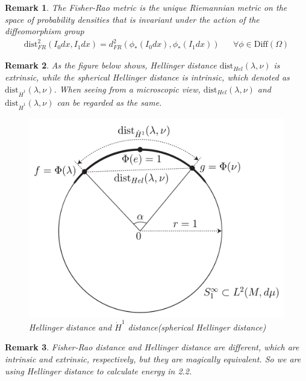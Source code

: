 \documentclass{article}
\theoremstyle{definition}
\theoremstyle{plain}
\newtheorem{remark}{Remark}
\begin{document}
\begin{remark}
The Fisher-Rao metric is the unique Riemannian metric on the space of probability densities that is invariant under the action of the diffeomorphism group
\begin{align*}
    \mathrm{dist}^2_{FR}(I_0dx,I_1dx)=d^2_{FR}(\phi_*(I_0dx),\phi_*(I_1dx)) &&\forall \phi\in \mathrm{Diff}(\Omega)
\end{align*}
\end{remark}

\begin{remark}
As the figure below shows, Hellinger distance $\mathrm{dist}_{Hel}(\lambda, \nu)$ is extrinsic, while the spherical Hellinger distance is intrinsic, which denoted as $\mathrm{dist}_{\Dot{H}^1}(\lambda, \nu)$. When seeing from a microscopic view, $\mathrm{dist}_{Hel}(\lambda, \nu)$ and $\mathrm{dist}_{\Dot{H}^1}(\lambda, \nu)$ can be regarded as the same.
\begin{figure}[H]
\centering
\includegraphics[scale=0.3]{figure/hellinger.png}
\caption{Hellinger distance and $\Dot H^1$ distance(spherical Hellinger distance)}
\end{figure}
\end{remark}

\begin{remark}\label{remark:fr}
Fisher-Rao distance and Hellinger distance are different, which are intrinsic and extrinsic, respectively, but they are magically equivalent. So we are using Hellinger distance to calculate energy in 2.2.
\end{remark}
\end{document}

